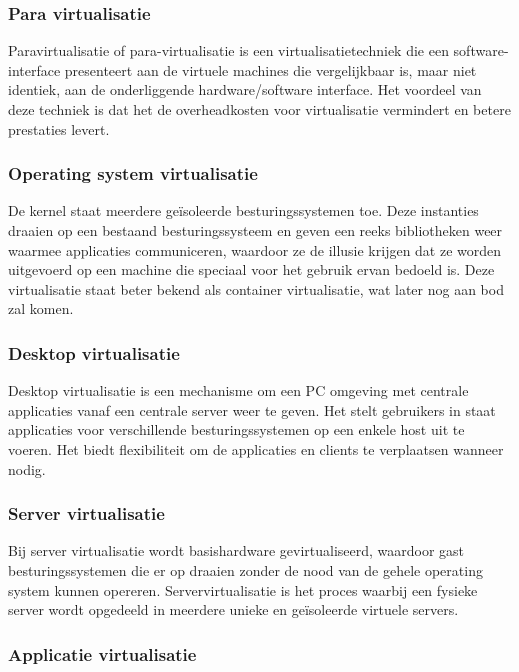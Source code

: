 \subsubsection{Para virtualisatie}

Paravirtualisatie of para-virtualisatie is een virtualisatietechniek die een software-interface presenteert aan de virtuele machines die vergelijkbaar is, maar niet identiek, aan de onderliggende hardware/software interface. Het voordeel van deze techniek is dat het de overheadkosten voor virtualisatie vermindert en betere prestaties levert. \autocite{Kedia2013}

\subsubsection{Operating system virtualisatie}

De kernel staat meerdere geïsoleerde besturingssystemen toe. Deze instanties draaien op een bestaand besturingssysteem en geven een reeks bibliotheken weer waarmee applicaties communiceren, waardoor ze de illusie krijgen dat ze worden uitgevoerd op een machine die speciaal voor het gebruik ervan bedoeld is. Deze virtualisatie staat beter bekend als container virtualisatie, wat later nog aan bod zal komen. \autocite{Kedia2013}

\subsubsection{Desktop virtualisatie}

Desktop virtualisatie is een mechanisme om een PC omgeving met centrale applicaties vanaf een centrale server weer te geven. Het stelt gebruikers in staat applicaties voor verschillende besturingssystemen op een enkele host uit te voeren. Het biedt flexibiliteit om de applicaties en clients te verplaatsen wanneer nodig. \autocite{Kedia2013}

\subsubsection{Server virtualisatie}

Bij server virtualisatie wordt basishardware gevirtualiseerd, waardoor gast besturingssystemen die er op draaien zonder de nood van de gehele operating system kunnen opereren. Servervirtualisatie is het proces waarbij een fysieke server wordt opgedeeld in meerdere unieke en geïsoleerde virtuele servers. \autocite{Kedia2013}

\subsubsection{Applicatie virtualisatie}


